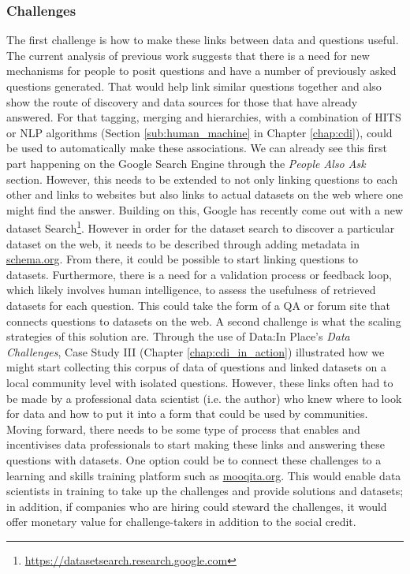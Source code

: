 \subsubsection{Challenges}
The first challenge is how to make these links between data and questions useful. The current analysis of previous work suggests that there is a need for new mechanisms for people to posit questions and have a number of previously asked questions generated. That would help link similar questions together and also show the route of discovery and data sources for those that have already answered. For that tagging, merging and hierarchies, with a combination of HITS or NLP algorithms (Section \ref{sub:human_machine} in Chapter \ref{chap:cdi}), could be used to automatically make these associations. We can already see this first part happening on the Google Search Engine through the \textit{People Also Ask} section. However, this needs to be extended to not only linking questions to each other and links to websites but also links to actual datasets on the web where one might find the answer. Building on this, Google has recently come out with a new dataset Search\footnote{\url{https://datasetsearch.research.google.com}}. However in order for the dataset search to discover a particular dataset on the web, it needs to be described through adding metadata in \href{https://schema.org}{schema.org}. From there, it could be possible to start linking questions to datasets. Furthermore, there is a need for a validation process or feedback loop, which likely involves human intelligence, to assess the usefulness of retrieved datasets for each question. This could take the form of a QA or forum site that connects questions to datasets on the web. A second challenge is what the scaling strategies of this solution are. Through the use of Data:In Place's \textit{Data Challenges}, Case Study III (Chapter \ref{chap:cdi_in_action}) illustrated how we might start collecting this corpus of data of questions and linked datasets on a local community level with isolated questions. However, these links often had to be made by a professional data scientist (i.e. the author) who knew where to look for data and how to put it into a form that could be used by communities. Moving forward, there needs to be some type of process that enables and incentivises data professionals to start making these links and answering these questions with datasets. One option could be to connect these challenges to a learning and skills training platform such as \href{https://mooqita.org}{mooqita.org}. This would enable data scientists in training to take up the challenges and provide solutions and datasets; in addition, if companies who are hiring could steward the challenges, it would offer monetary value for challenge-takers in addition to the social credit.

